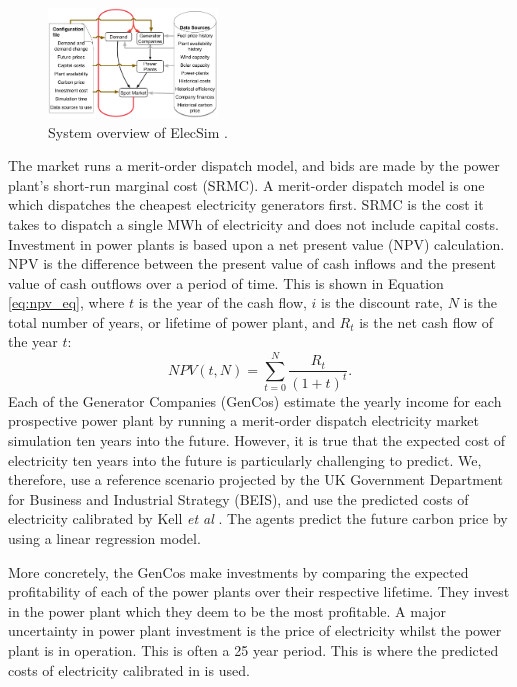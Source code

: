 \documentclass[final,3p,times,twocolumn,numbers]{elsarticle}
\begin{document}
\begin{figure}
\centering
    \includegraphics[width=0.4\textwidth,natwidth=610,natheight=400]{figures/methods/System_overview_large.png}
    \caption{System overview of ElecSim \cite{Kell}.}
    \label{fig:model_details}
\end{figure}


The market runs a merit-order dispatch model, and bids are made by the power plant's short-run marginal cost (SRMC). A merit-order dispatch model is one which dispatches the cheapest electricity generators first. SRMC is the cost it takes to dispatch a single MWh of electricity and does not include capital costs. Investment in power plants is based upon a net present value (NPV) calculation. NPV is the difference between the present value of cash inflows and the present value of cash outflows over a period of time. This is shown in Equation \ref{eq:npv_eq}, where $t$ is the year of the cash flow, $i$ is the discount rate, $N$ is the total number of years, or lifetime of power plant, and $R_t$ is the net cash flow of the year $t$:
\begin{equation} \label{eq:npv_eq}
NPV(t, N) = \sum_{t=0}^{N}\frac{R_t}{(1+t)^t}.
\end{equation}
Each of the Generator Companies (GenCos) estimate the yearly income for each prospective power plant by running a merit-order dispatch electricity market simulation ten years into the future. However, it is true that the expected cost of electricity ten years into the future is particularly challenging to predict. We, therefore, use a reference scenario projected by the UK Government Department for Business and Industrial Strategy (BEIS), and use the predicted costs of electricity calibrated by Kell \textit{et al} \cite{Kell2020, DBEIS2019}. The agents predict the future carbon price by using a linear regression model.

More concretely, the GenCos make investments by comparing the expected profitability of each of the power plants over their respective lifetime. They invest in the power plant which they deem to be the most profitable. A major uncertainty in power plant investment is the price of electricity whilst the power plant is in operation. This is often a 25 year period. This is where the predicted costs of electricity calibrated in \cite{Kell2020} is used.
 
\end{document}
